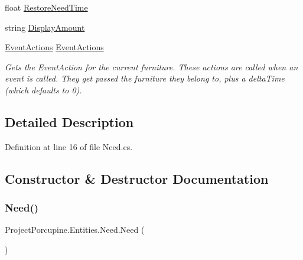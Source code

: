 \begin{DoxyCompactItemize}
float \hyperlink{class_project_porcupine_1_1_entities_1_1_need_a64b98312bcc8d39c636cf52a9c0d1283}{Restore\+Need\+Time}
\item 
string \hyperlink{class_project_porcupine_1_1_entities_1_1_need_a9ee9f436ab282d791c37869442ffb10d}{Display\+Amount}
\item 
\hyperlink{class_event_actions}{Event\+Actions} \hyperlink{class_project_porcupine_1_1_entities_1_1_need_a06702925123a4542be6e8e39c77128d3}{Event\+Actions}
\begin{DoxyCompactList}\small\item\em Gets the Event\+Action for the current furniture. These actions are called when an event is called. They get passed the furniture they belong to, plus a delta\+Time (which defaults to 0). \end{DoxyCompactList}\end{DoxyCompactItemize}


\subsection{Detailed Description}


Definition at line 16 of file Need.\+cs.



\subsection{Constructor \& Destructor Documentation}
\mbox{\label{class_project_porcupine_1_1_entities_1_1_need_a148253883ad936962964886824a16806}} 
\subsubsection{\texorpdfstring{Need()}{Need()}}
{\footnotesize\ttfamily Project\+Porcupine.\+Entities.\+Need.\+Need (\begin{DoxyParamCaption}{ }\end{DoxyParamCaption})}



